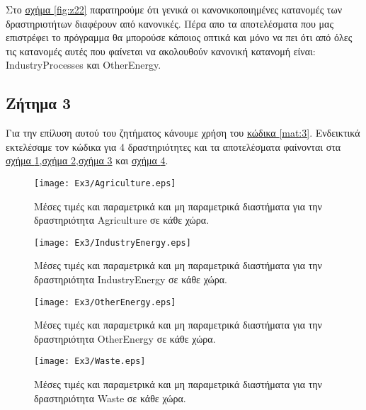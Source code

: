 \documentclass[11pt]{scrartcl} %
\begin{document}
Στο \hyperref[fig:z22]{σχήμα \ref*{fig:z22}} παρατηρούμε ότι γενικά οι κανονικοποιημένες κατανομές των δραστηριοτήτων διαφέρουν από κανονικές. Πέρα απο τα αποτελέσματα που μας επιστρέφει το πρόγραμμα θα μπορούσε κάποιος οπτικά και μόνο να πει ότι από όλες τις κατανομές αυτές που φαίνεται να ακολουθούν κανονική κατανομή είναι: IndustryProcesses και OtherEnergy.   






\subsection{Ζήτημα 3}
\label{subsec:z3}

Για την επίλυση αυτού του ζητήματος κάνουμε χρήση του \hyperref[mat:3]{κώδικα \ref*{mat:3}}. Ενδεικτικά εκτελέσαμε τον κώδικα για 4 δραστηριότητες και τα αποτελέσματα φαίνονται στα \hyperref[fig:z31]{σχήμα \ref*{fig:z31}},\hyperref[fig:z32]{σχήμα \ref*{fig:z32}},\hyperref[fig:z33]{σχήμα \ref*{fig:z33}} και \hyperref[fig:z34]{σχήμα \ref*{fig:z34}}.


\begin{figure}[H]

	\centering
	\texttt{[image: Ex3/Agriculture.eps]}	
\caption{Μέσες τιμές και παραμετρικά και μη παραμετρικά διαστήματα για την δραστηριότητα Agriculture σε κάθε χώρα.}
\label{fig:z31} 
\end{figure}

\begin{figure}[H]
 
	\centering
	\texttt{[image: Ex3/IndustryEnergy.eps]}	
\caption{Μέσες τιμές και παραμετρικά και μη παραμετρικά διαστήματα για την δραστηριότητα IndustryEnergy σε κάθε χώρα.}
\label{fig:z32}
\end{figure}

\begin{figure}[H]

	\centering
	\texttt{[image: Ex3/OtherEnergy.eps]}	
\caption{Μέσες τιμές και παραμετρικά και μη παραμετρικά διαστήματα για την δραστηριότητα OtherEnergy σε κάθε χώρα.}
\label{fig:z33} 
\end{figure}

\begin{figure}[H]
 
	\centering
	\texttt{[image: Ex3/Waste.eps]}	
\caption{Μέσες τιμές και παραμετρικά και μη παραμετρικά διαστήματα για την δραστηριότητα Waste σε κάθε χώρα.}
\label{fig:z34}
\end{figure}
\end{document}
